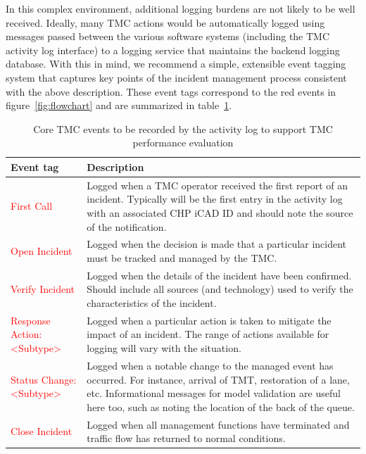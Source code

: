 \documentclass[12pt]{report}
\begin{document}
In this complex environment, additional logging burdens are not likely to be
well received.  Ideally, many \ac{TMC} actions would be automatically logged
using messages passed between the various software systems (including the
\ac{TMC} activity log interface) to a logging service that maintains the backend
logging database.  With this in mind, we recommend a simple, extensible event
tagging system that captures key points of the incident management process
consistent with the above description.  These event tags correspond to the red
events in figure~\ref{fig:flowchart} and are summarized in
table~\ref{tab:tmc-event-summary}.
\begin{table}[ht]
  \centering
 \footnotesize
\begin{tabularx}{\textwidth}{lX}
  \hline
  \textbf{Event tag} & \textbf{Description}\\
  \hline {\sc \textcolor{red}{First Call}} & Logged when a \ac{TMC}
  operator received the first report of an incident.  Typically will
  be the first entry in the activity log with an associated \ac{CHP}
  \ac{iCAD} ID
  and should note the source of the notification.  \\
  {\sc \textcolor{red}{Open Incident}} & Logged when the decision is
  made that a particular incident must be tracked and
  managed by the \ac{TMC}.\\
  {\sc \textcolor{red}{Verify Incident}} & Logged when the details of
  the incident have been confirmed.  Should include all sources (and
  technology) used to verify the characteristics of the incident.  \\
  {\sc \textcolor{red}{Response Action:<Subtype>}} & Logged when a
  particular action is taken to mitigate the impact of an incident.
  The range of actions available for logging will vary with the
  situation.\\
  {\sc \textcolor{red}{Status Change:<Subtype>}} & Logged when a
  notable change to the managed event has occurred.  For instance,
  arrival of \ac{TMT}, restoration of a lane, etc.  Informational
  messages for model validation are useful here too, such as noting
  the
  location of the back of the queue.\\
  {\sc \textcolor{red}{Close Incident}} & Logged when all management
  functions have terminated and traffic flow has returned to normal
  conditions. \\
  \hline
\end{tabularx}
  \caption{Core TMC events to be recorded by the activity log to support TMC performance evaluation}
  \label{tab:tmc-event-summary}
\end{table}
\end{document}

